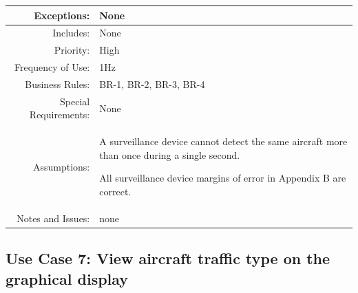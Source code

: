 \documentclass[12pt,oneside,letterpaper]{article}
\newenvironment{packed_enumerate}{ %
\vspace{-7mm}
\begin{enumerate}
  \setlength{\itemsep}{0pt}
  \setlength{\parskip}{0pt}
  \setlength{\parsep}{0pt}
}{\end{enumerate}
\vspace{-8mm}}
\begin{document}
\begin{longtable}{|r|p{3.8in}|}
\hline
Exceptions:&None\\
\hline
Includes:&None\\
\hline
Priority:&High\\
\hline
Frequency of Use:&1Hz\\
\hline
Business Rules:&BR-1, BR-2, BR-3, BR-4\\
\hline
Special Requirements:&None\\
\hline
Assumptions: &
\begin{packed_enumerate}
\item A surveillance device cannot detect the same aircraft more than once during a single second.
\item All surveillance device margins of error in Appendix B are correct.
\end{packed_enumerate}\\
\hline
Notes and Issues:&none\\
\hline
\end{longtable}

\subsection{\label{View traffic type}Use Case 7: View aircraft traffic type on the graphical display}
\end{document}
